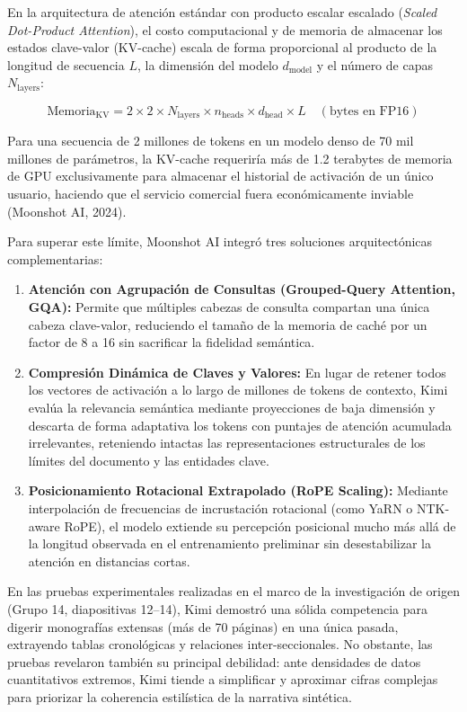 En la arquitectura de atención estándar con producto escalar escalado (\textit{Scaled Dot-Product Attention}), el costo computacional y de memoria de almacenar los estados clave-valor (KV-cache) escala de forma proporcional al producto de la longitud de secuencia $L$, la dimensión del modelo $d_{\text{model}}$ y el número de capas $N_{\text{layers}}$:

\begin{equation}
    \text{Memoria}_{\text{KV}} = 2 \times 2 \times N_{\text{layers}} \times n_{\text{heads}} \times d_{\text{head}} \times L \quad (\text{bytes en FP16})
    \label{eq:kv_cache_memory}
\end{equation}

Para una secuencia de 2 millones de tokens en un modelo denso de 70 mil millones de parámetros, la KV-cache requeriría más de 1.2 terabytes de memoria de GPU exclusivamente para almacenar el historial de activación de un único usuario, haciendo que el servicio comercial fuera económicamente inviable (Moonshot AI, 2024).

Para superar este límite, Moonshot AI integró tres soluciones arquitectónicas complementarias:
\begin{enumerate}[label=\alph*), leftmargin=2em]
    \item \textbf{Atención con Agrupación de Consultas (Grouped-Query Attention, GQA):} Permite que múltiples cabezas de consulta compartan una única cabeza clave-valor, reduciendo el tamaño de la memoria de caché por un factor de 8 a 16 sin sacrificar la fidelidad semántica.
    \item \textbf{Compresión Dinámica de Claves y Valores:} En lugar de retener todos los vectores de activación a lo largo de millones de tokens de contexto, Kimi evalúa la relevancia semántica mediante proyecciones de baja dimensión y descarta de forma adaptativa los tokens con puntajes de atención acumulada irrelevantes, reteniendo intactas las representaciones estructurales de los límites del documento y las entidades clave.
    \item \textbf{Posicionamiento Rotacional Extrapolado (RoPE Scaling):} Mediante interpolación de frecuencias de incrustación rotacional (como YaRN o NTK-aware RoPE), el modelo extiende su percepción posicional mucho más allá de la longitud observada en el entrenamiento preliminar sin desestabilizar la atención en distancias cortas.
\end{enumerate}

En las pruebas experimentales realizadas en el marco de la investigación de origen (Grupo 14, diapositivas 12--14), Kimi demostró una sólida competencia para digerir monografías extensas (más de 70 páginas) en una única pasada, extrayendo tablas cronológicas y relaciones inter-seccionales. No obstante, las pruebas revelaron también su principal debilidad: ante densidades de datos cuantitativos extremos, Kimi tiende a simplificar y aproximar cifras complejas para priorizar la coherencia estilística de la narrativa sintética.

